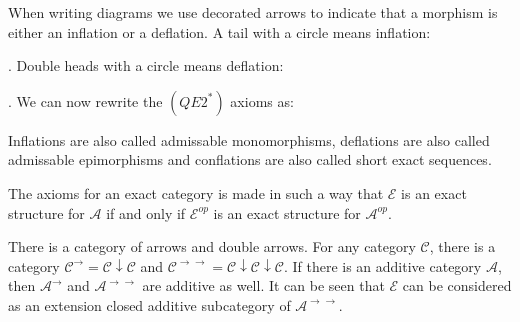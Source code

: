     \begin{remark}
        When writing diagrams we use decorated arrows to indicate that a morphism is either an inflation or a deflation. A tail with a circle means inflation: . Double heads with a circle means deflation: . We can now rewrite the $(QE2^*)$ axioms as:
        \begin{center}
        \end{center}
    \end{remark}

    \begin{remark}
        Inflations are also called admissable monomorphisms, deflations are also called admissable epimorphisms and conflations are also called short exact sequences.
    \end{remark}

    \begin{remark}
        The axioms for an exact category is made in such a way that $\mathcal{E}$ is an exact structure for $\mathcal{A}$ if and only if $\mathcal{E}^{op}$ is an exact structure for $\mathcal{A}^{op}$.
    \end{remark}

    \begin{remark}
        There is a category of arrows and double arrows. For any category $\mathcal{C}$, there is a category $\mathcal{C}^{\rightarrow}=\mathcal{C}\downarrow\mathcal{C}$ and $\mathcal{C}^{\rightarrow\rightarrow}=\mathcal{C}\downarrow\mathcal{C}\downarrow\mathcal{C}$. If there is an additive category $\mathcal{A}$, then $\mathcal{A}^{\rightarrow}$ and $\mathcal{A}^{\rightarrow\rightarrow}$ are additive as well. It can be seen that $\mathcal{E}$ can be considered as an extension closed additive subcategory of $\mathcal{A}^{\rightarrow\rightarrow}$.
    \end{remark}

